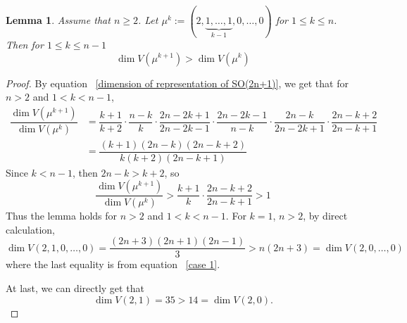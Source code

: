 \documentclass[a4paper]{amsart}
\theoremstyle{plain}
\newtheorem{lem}[thm]{Lemma}
\theoremstyle{remark} \newtheorem{remark}[thm]{Remark}
\theoremstyle{remark} \newtheorem{exercise}{Exercise}
\theoremstyle{remark} \newtheorem{example}{Example}
\numberwithin{equation}{section}
\begin{document}
\begin{lem}\label{second type1}
    Assume that $n\geqslant 2$. Let $\mu^k:=(2,\underbrace{1,\dots,1}_{k-1},0,\dots,0)$ for $1\leqslant k\leqslant n$. Then for $1\leqslant k\leqslant n-1$
    \begin{equation}
        \dim V(\mu^{k+1})>\dim V(\mu^{k})
    \end{equation}
\end{lem}
\begin{proof}
    By equation ~\eqref{dimension of representation of SO(2n+1)},  we get that for $n>2$ and $1<k<n-1$,
    \[
    \begin{aligned}
        \dfrac{\dim V(\mu^{k+1})}{\dim V(\mu^k)}%
        &=\dfrac{k+1}{k+2}\cdot \dfrac{n-k}{k}\cdot \dfrac{2n-2k+1}{2n-2k-1}\cdot \dfrac{2n-2k-1}{n-k}\cdot \dfrac{2n-k}{2n-2k+1} \cdot \dfrac{2n-k+2}{2n-k+1}\\
        &=\dfrac{(k+1)(2n-k)(2n-k+2)}{k(k+2)(2n-k+1)}
    \end{aligned} 
    \]
    Since $k<n-1$, then $2n-k>k+2$, so 
    \[
    \dfrac{\dim V(\mu^{k+1})}{\dim V(\mu^k)}>\dfrac{k+1}{k}\cdot \dfrac{2n-k+2}{2n-k+1}>1
    \]
    Thus the lemma holds for $n>2$ and $1<k<n-1$. For $k=1$, $n>2$, by direct calculation, 
    \[
    \dim V(2,1,0,\dots,0)=\dfrac{(2n+3)(2n+1)(2n-1)}{3}>n(2n+3)=\dim V(2,0,\dots,0)
    \]
    where the last equality is from equation ~\eqref{case 1}.

    At last,  we can directly get that
    \[
    \dim V(2,1)=35>14=\dim V(2,0).
    \]
\end{proof}
\end{document}

